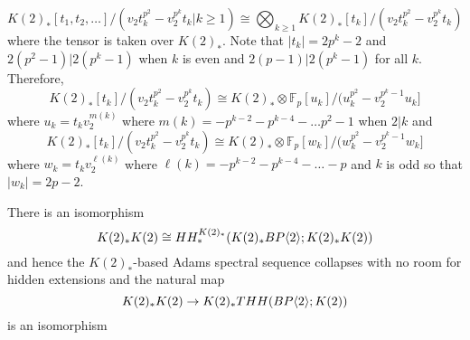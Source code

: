 \begin{equation}\label{K(2) computation} K(2)_*[t_1,t_2, \dots]/(v_2t_k^{p^2}-v_2^{p^k}t_k | k\ge 1) \cong \bigotimes_{k\ge 1} K(2)_*[t_k]/(v_2t_k^{p^2}-v_2^{p^k}t_k )\end{equation}
where the tensor is taken over $K(2)_*$. Note that $|t_k|=2p^k-2$ and $2(p^2-1)| 2(p^k-1)$ when $k$ is even and $2(p-1)| 2(p^k-1)$ for all $k$. Therefore, 
\[ K(2)_*[t_k]/(v_2t_k^{p^2}-v_2^{p^k}t_k )\cong K(2)_*\otimes \mathbb{F}_p[u_k]/(u_k^{p^2}-v_2^{p^k-1}u_k]\]
where $u_k=t_kv_2^{m(k)}$ where $m(k)=-p^{k-2}-p^{k-4} - \dots p^2-1$ when $2|k$ and 
\[ K(2)_*[t_k]/(v_2t_k^{p^2}-v_2^{p^k}t_k )\cong K(2)_*\otimes \mathbb{F}_p[w_k]/(w_k^{p^2}-v_2^{p^k-1}w_k]\]
where $w_k=t_kv_2^{\ell(k)}$ where $\ell(k)=-p^{k-2}-p^{k-4} -\dots -p$ and $k$ is odd so that $|w_k|=2p-2$. 
\begin{lem}
There is an isomorphism
\[ K(2)_*K(2)\cong HH_*^{K(2)_*}(K(2)_*BP\langle 2 \rangle;K(2)_*K(2))\] 
and hence the $K(2)_*$-based Adams spectral sequence collapses with no room for hidden extensions and the natural map 
\[ K(2)_*K(2)\rightarrow K(2)_*THH(BP\langle 2 \rangle;K(2)) \]
is an isomorphism
\end{lem}
